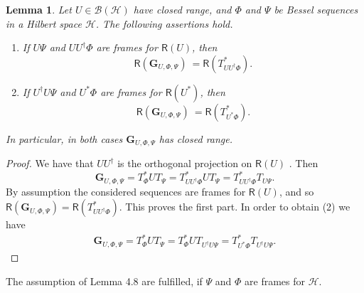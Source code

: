 \documentclass{birkjour}
\newtheorem{lem}[thm]{Lemma}
\theoremstyle{definition}
\theoremstyle{remark}
\numberwithin{equation}{section}
\newcommand{\range}[1]{\mathsf{R}\left( #1 \right)}
\def\Hil{\mathcal{H}}
\newcommand{\BL}[1]{
{\mathcal B} \left( #1 \right)
}
\begin{document}
\begin{lem}\label{lem:closedrang1} Let $U\in \BL{\Hil}$ have closed range, and $\Phi$ and $\Psi$ be Bessel sequences in a Hilbert space $\Hil$. The following assertions hold.
\begin{enumerate}
\item[(1)]  If $U \Psi$
 and $U U^\dag \Phi$
 are frames for $\range{U}$, then
$$ \range{\mathbf{G}_{U,\Phi,\Psi}}\ = \range{T_{U U^\dag \Phi}^*}.$$
\item[(2)]  If $U^\dag U \Psi$ 
and $U^* \Phi$ 
are frames for $\range{U^*}$, then
$$ \range{\mathbf{G}_{U,\Phi,\Psi}}\ = \range{T_{U^* \Phi}^*}.$$
\end{enumerate}
In particular, in both cases $\mathbf{G}_{U,\Phi,\Psi}$ has
closed range.

\end{lem}
\begin{proof} We have that $U U^\dag$ is the orthogonal projection on $\range{U}$ \cite{olepinv}. Then
$$ \mathbf{G}_{U,\Phi,\Psi} =  T_\Phi^* U T_\Psi = T_{U U^\dag \Phi}^* U T_\Psi = T_{U U^\dag \Phi}^* T_{U \Psi}.$$
By assumption the considered sequences are frames for $\range{U}$,
and so $\range{\mathbf{G}_{U,\Phi,\Psi}} = \range{T_{U U^\dag
\Phi}^*}.$ This proves the first part. In order to obtain
(2) we have
\begin{eqnarray*}
\mathbf{G}_{U,\Phi,\Psi} =  T_\Phi^* U T_\Psi = T_{\Phi}^* U T_{U^\dag U\Psi} = T_{U^* \Phi}^* T_{U^\dag U\Psi}.
\end{eqnarray*}
\end{proof}
The assumption of Lemma 4.8 are fulfilled, if $\Psi$ and $\Phi$ are frames for $\mathcal{H}$.
\end{document}
